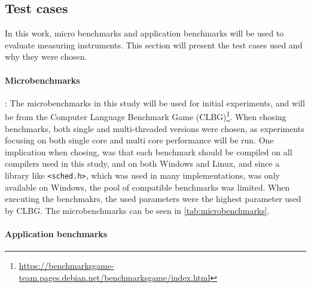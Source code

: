 \subsection{Test cases}

In this work, micro benchmarks and application benchmarks will be used to evaluate measuring instruments. This section will present the test cases used and why they were chosen.

\paragraph{Microbenchmarks}: The microbenchmarks in this study will be used for initial experiments, and will be from the Computer Language Benchmark Game (CLBG)\footnote{\url{https://benchmarksgame-team.pages.debian.net/benchmarksgame/index.html}}. When chosing benchmarks, both single and multi-threaded versions were chosen, as experiments focusing on both single core and multi core performance will be run. One implication when chosing, was that each benchmark should be compiled on all compilers used in this study, and on both Windows and Linux, and since a library like \texttt{<sched.h>}, which was used in many implementations, was only available on Windows, the pool of compatible benchmarks was limited. When executing the benchmakrs, the used parameters were the highest parameter used by CLBG. The microbenchmarks can be seen in \cref{tab:microbenchmarks}.



\paragraph{Application benchmarks}
